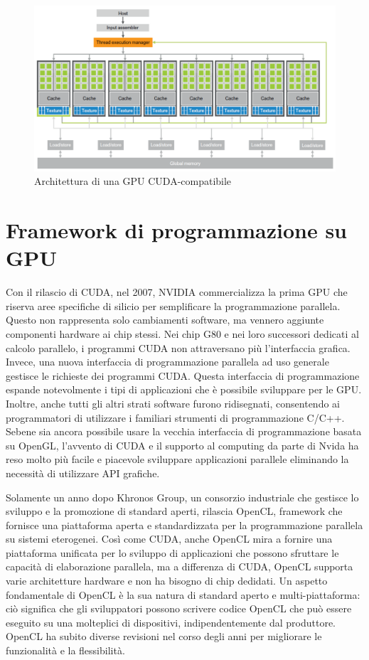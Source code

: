 \begin{figure}[ht]
    \centering
    \includegraphics[width=.9\linewidth]{images/chapter2/cuda_arch.png}
    \caption{Architettura di una GPU CUDA-compatibile}
    \label{fig:cuda_arch}
\end{figure}


\section[Framework di programmazione su GPU]{Framework di programmazione su GPU}


Con il rilascio di CUDA, nel 2007, NVIDIA commercializza la prima GPU che riserva aree specifiche di silicio per semplificare la programmazione parallela. Questo non rappresenta solo cambiamenti software, ma vennero aggiunte componenti hardware ai chip stessi. Nei chip G80 e nei loro successori dedicati al calcolo parallelo, i programmi CUDA non attraversano più l'interfaccia grafica. Invece, una nuova interfaccia di programmazione parallela ad uso generale gestisce le richieste dei programmi CUDA. Questa interfaccia di programmazione espande notevolmente i tipi di applicazioni che è possibile sviluppare per le GPU. Inoltre, anche tutti gli altri strati software furono ridisegnati, consentendo ai programmatori di utilizzare i familiari strumenti di programmazione C/C++. Sebene sia ancora possibile usare la vecchia interfaccia di programmazione basata su OpenGL, l'avvento di CUDA e il supporto al computing da parte di Nvida ha reso molto più facile e piacevole sviluppare applicazioni parallele eliminando la necessità di utilizzare API grafiche.

Solamente un anno dopo Khronos Group, un consorzio industriale che gestisce lo sviluppo e la promozione di standard aperti, rilascia OpenCL, framework che fornisce una piattaforma aperta e standardizzata per la programmazione parallela su sistemi eterogenei. Così come CUDA, anche OpenCL mira a fornire una piattaforma unificata per lo sviluppo di applicazioni che possono sfruttare le capacità di elaborazione parallela, ma a differenza di CUDA, OpenCL supporta varie architetture hardware e non ha bisogno di chip dedidati. Un aspetto fondamentale di OpenCL è la sua natura di standard aperto e multi-piattaforma: ciò significa che gli sviluppatori possono scrivere codice OpenCL che può essere eseguito su una molteplici di dispositivi, indipendentemente dal produttore. OpenCL ha subito diverse revisioni nel corso degli anni per migliorare le funzionalità e la flessibilità. 

